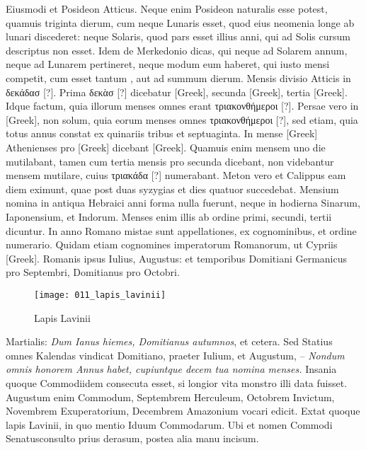 Eiusmodi et Posideon Atticus.
Neque enim Posideon
naturalis esse potest, quamuis triginta dierum, cum neque Lunaris
esset, quod eius neomenia longe ab lunari discederet: neque Solaris,
quod pars esset illius anni, qui ad Solis cursum descriptus non esset.
Idem de Merkedonio dicas, qui neque ad Solarem annum, neque ad
Lunarem pertineret, neque modum eum haberet, qui iusto mensi
competit, cum esset tantum , aut ad summum  dierum.
Mensis divisio Atticis in \textgreek{δεκάδασ [?]}.
Prima \textgreek{δεκὰσ [?]} dicebatur \textgreek{[Greek]},
secunda \textgreek{[Greek]}, tertia \textgreek{[Greek]}.
Idque factum, quia
illorum menses omnes erant \textgreek{τριακονθήμεροι [?]}.
Persae vero in \textgreek{[Greek]},
non solum, quia eorum menses omnes \textgreek{τριακονθήμεροι [?]},
 sed etiam, quia
totus annus constat ex quinariis tribus et septuaginta.
In mense \textgreek{[Greek]}
Athenienses pro \textgreek{[Greek]} dicebant \textgreek{[Greek]}.
Quamuis
enim mensem uno die mutilabant, tamen cum tertia mensis
pro secunda dicebant, non videbantur mensem mutilare, cuius
\textgreek{τριακάδα [?]} numerabant.
Meton vero et Calippus eam diem eximunt,
quae post duas syzygias et dies quatuor succedebat.
Mensium nomina
in antiqua Hebraici anni forma nulla fuerunt, neque in hodierna
Sinarum, Iaponensium, et Indorum.
Menses enim illis ab ordine
primi, secundi, tertii dicuntur.
In anno Romano mistae sunt appellationes,
ex cognominibus, et ordine numerario.
Quidam etiam cognomines
imperatorum Romanorum, ut Cypriis \textgreek{[Greek]}.
Romanis ipsus Iulius, Augustus: et temporibus Domitiani
Germanicus pro Septembri, Domitianus pro Octobri.
\begin{figure}[t]
  \centering
  \texttt{[image: 011\_lapis\_lavinii]}
  \caption{Lapis Lavinii}
  \label{fig:lapis_lavinii}
\end{figure}
Martialis:
 \textit{Dum Ianus hiemes, Domitianus
autumnos}, et cetera.
Sed Statius omnes
Kalendas vindicat Domitiano,
praeter Iulium, et Augustum,
– \textit{Nondum omnis honorem
Annus habet, cupiuntque decem tua
nomina menses.}
Insania quoque
Commodiidem consecuta esset, si
longior vita monstro illi data fuisset.
Augustum enim Commodum,
Septembrem Herculeum, Octobrem
Invictum, Novembrem
Exuperatorium, Decembrem
Amazonium vocari edicit.
Extat
quoque lapis Lavinii, in quo mentio
Iduum Commodarum.
Ubi et
nomen Commodi Senatusconsulto prius derasum, postea alia manu
incisum.

